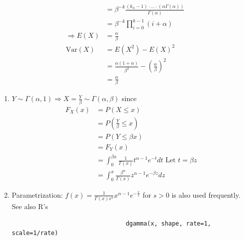 \documentclass{article}
\newcommand{\Var}{\mathrm{Var}}
\begin{document}
\begin{itemize}
\begin{align*}
								&=\beta^{-k}\frac{(k_\alpha-1)\cdot\dots\cdot(\alpha\Gamma(\alpha))}{\Gamma(\alpha)}\\
								&=\beta^{-k}\prod_{i=0}^{k-1}(i+\alpha)\\
								\Rightarrow E(X)&=\frac{\alpha}{\beta}\\
								\Var(X)&=E(X^2)-E(X)^2\\
								&=\frac{\alpha(1+\alpha)}{\beta^2}-(\frac{\alpha}{\beta})^2\\
								&=\frac{\alpha}{\beta}
							\end{align*}
					\begin{myrem*}{}{}
						\begin{enumerate}
							\item $Y\sim\Gamma(\alpha, 1)\Rightarrow X=\frac{Y}{\beta}\sim\Gamma(\alpha, \beta)$ since
							\begin{align*}
								F_X(x)&=P(X\leq x)\\
								&=P(\frac{Y}{\beta}\leq x)\\
								&=P(Y\leq\beta x)\\
								&=F_Y(x)\\
								&=\int_0^{\beta x}\frac{1}{\Gamma(x)}t^{\alpha-1}e^{-t}dt\mbox{ Let $t=\beta z$}\\
								&=\int_0^x\frac{\beta^{\alpha}}{\Gamma(x)}z^{\alpha-1}e^{-\beta z}dz
							\end{align*}
							
							\item Parametrization: $f(x)=\frac{1}{\Gamma(x)s^{\alpha}}x^{\alpha-1}e^{-\frac{x}{s}}$ for $s>0$ is also used frequently. See also R's
							\begin{verbatim}
								dgamma(x, shape, rate=1, scale=1/rate)
							\end{verbatim}
						\end{enumerate}
					\end{myrem*}
				\end{itemize}
				
\end{document}
